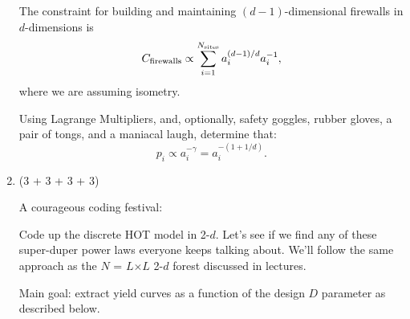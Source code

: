 \begin{enumerate}
  The constraint for building and maintaining 
  $(d-1)$-dimensional firewalls in $d$-dimensions is
  $$
  C_{\rm firewalls} 
  \propto 
  \sum_{i=1}^{N_{\rm sites}} a_i^{(d-1)/d} a_i^{-1},
  $$
  where we are assuming isometry.

  Using Lagrange Multipliers, and, optionally, safety goggles,
  rubber gloves, a pair of tongs, and a maniacal laugh,
  determine that:
  $$ 
  p_i 
  \propto 
  a_i^{-\gamma} 
  = 
  a_i^{-(1 + 1/d)}.
  $$


  
   \solutionstart


   \solutionend


\item (3 + 3 + 3 + 3)

  A courageous coding festival:

  Code up the discrete HOT model in 2-$d$.
  Let's see if we find any of these super-duper power laws
  everyone keeps talking about.  We'll follow the same
  approach as the $N$ = $L$$\times$$L$ 2-$d$ forest discussed in lectures.

  Main goal: extract yield curves as a function
  of the design $D$ parameter as described below.


\end{enumerate}
